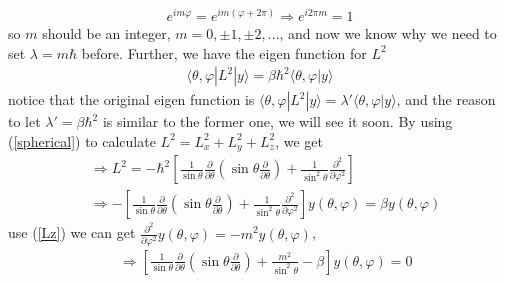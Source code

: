 \documentclass[UTF8,12pt]{article} %
\begin{document}
\begin{align}
e^{im\varphi} = e^{im(\varphi + 2\pi)} \Rightarrow e^{i2\pi m} = 1
\end{align}
so $m$ should be an integer, $m = 0, \pm1, \pm2, ...$, and now we know why we need to set $\lambda = m\hbar$ before. Further, we have the eigen function for $L^{2}$
\begin{align}
\langle\theta, \varphi|L^{2}|y\rangle = \beta\hbar^{2}\langle\theta,\varphi|y\rangle
\end{align}
notice that the original eigen function is $\langle\theta, \varphi|L^{2}|y\rangle = \lambda'\langle\theta,\varphi|y\rangle$, and the reason to let $\lambda' = \beta\hbar^{2}$ is similar to the former one, we will see it soon. By using (\ref{spherical}) to calculate $L^{2} = L_{x}^{2} + L_{y}^{2} + L_{z}^{2}$, we get
\begin{align}
&\Rightarrow L^{2} = -\hbar^{2}\left[\frac{1}{\sin\theta}\frac{\partial}{\partial\theta}\left(\sin\theta\frac{\partial}{\partial\theta}\right) + \frac{1}{\sin^{2}\theta}\frac{\partial^{2}}{\partial\varphi^{2}}\right] \\
&\Rightarrow -\left[\frac{1}{\sin\theta}\frac{\partial}{\partial\theta}\left(\sin\theta\frac{\partial}{\partial\theta}\right) + \frac{1}{\sin^{2}\theta}\frac{\partial^{2}}{\partial\varphi^{2}}\right] y(\theta,\varphi) = \beta y(\theta,\varphi)
\end{align}
use (\ref{Lz}) we can get $\frac{\partial^{2}}{\partial\varphi^{2}} y(\theta,\varphi) = -m^{2} y(\theta,\varphi)$,
\begin{align}
&\Rightarrow \left[\frac{1}{\sin\theta}\frac{\partial}{\partial\theta}\left(\sin\theta\frac{\partial}{\partial\theta}\right) + \frac{m^{2}}{\sin^{2}\theta} - \beta\right] y(\theta,\varphi) = 0
\end{align}
\end{document}
